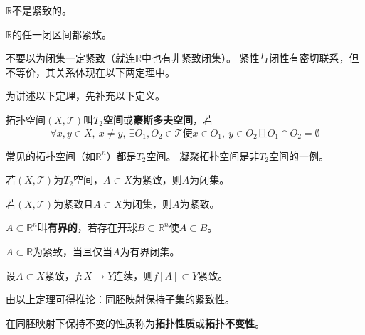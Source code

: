 \begin{example}
	$\mathbb{R}$不是紧致的。
\end{example}

\begin{theorem}
	$\mathbb{R}$的任一闭区间都紧致。
\end{theorem}

\begin{note}
	不要以为闭集一定紧致（就连$\mathbb{R}$中也有非紧致闭集）。
	紧性与闭性有密切联系，但不等价，其关系体现在以下两定理中。
\end{note}

为讲述以下定理，先补充以下定义。

\begin{definition}
	拓扑空间$(X, \mathscr{T})$叫\textbf{$T_2$空间}或\textbf{豪斯多夫空间}，若
	$$\forall x, y \in X, ~ x \neq y, ~ \exists O_1, O_2 \in \mathscr{T} \text{使} x \in O_1, ~ y \in O_2 \text{且} O_1 \cap O_2 = \emptyset$$
\end{definition}

\begin{note}
	常见的拓扑空间（如$\mathbb{R}^n$）都是$T_2$空间。
	凝聚拓扑空间是非$T_2$空间的一例。
\end{note}

\begin{theorem}
	若$(X, \mathscr{T})$为$T_2$空间，$A \subset X$为紧致，则$A$为闭集。
\end{theorem}

\begin{theorem}
	若$(X, \mathscr{T})$为紧致且$A \subset X$为闭集，则$A$为紧致。
\end{theorem}

\begin{definition}
	$A \subset \mathbb{R}^n$叫\textbf{有界的}，若存在开球$B \subset \mathbb{R}^n$使$A \subset B$。
\end{definition}

\begin{theorem}
	$A \subset \mathbb{R}$为紧致，当且仅当$A$为有界闭集。
\end{theorem}

\begin{theorem}
	设$A \subset X$紧致，$f \colon X \to Y$连续，则$f[A] \subset Y$紧致。
\end{theorem}

由以上定理可得推论：同胚映射保持子集的紧致性。

\begin{definition}
	在同胚映射下保持不变的性质称为\textbf{拓扑性质}或\textbf{拓扑不变性}。
\end{definition}

